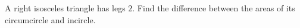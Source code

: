 A right isosceles triangle has legs $2$. Find the difference between the areas of its circumcircle and incircle.
